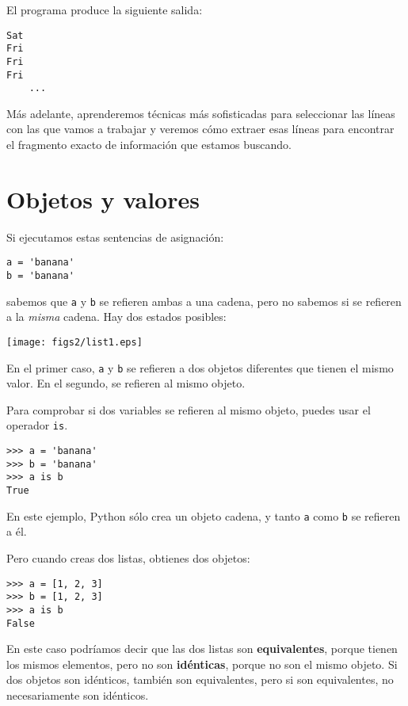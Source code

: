 El programa produce la siguiente salida:

\beforeverb
\begin{verbatim}
Sat
Fri
Fri
Fri
    ...
\end{verbatim}
\afterverb
%
Más adelante, aprenderemos técnicas más sofisticadas para
seleccionar las líneas con las que vamos a trabajar y veremos cómo extraer
esas líneas para encontrar el fragmento exacto de información
que estamos buscando.

\section{Objetos y valores}


Si ejecutamos estas sentencias de asignación:

\beforeverb
\begin{verbatim}
a = 'banana'
b = 'banana'
\end{verbatim}
\afterverb
%
sabemos que {\tt a} y {\tt b} se refieren ambas a una
cadena, pero no sabemos si se refieren a la
\emph{misma} cadena. Hay dos estados posibles:


\beforefig
\centerline{\texttt{[image: figs2/list1.eps]}}
\afterfig

En el primer caso, {\tt a} y {\tt b} se refieren a dos objetos diferentes que
tienen el mismo valor. En el segundo, se refieren al mismo
objeto.


Para comprobar si dos variables se refieren al mismo objeto, puedes
usar el operador {\tt is}.

\beforeverb
\begin{verbatim}
>>> a = 'banana'
>>> b = 'banana'
>>> a is b
True
\end{verbatim}
\afterverb
%
En este ejemplo, Python sólo crea un objeto cadena,
y tanto {\tt a} como {\tt b} se refieren a él.

Pero cuando creas dos listas, obtienes dos objetos:

\beforeverb
\begin{verbatim}
>>> a = [1, 2, 3]
>>> b = [1, 2, 3]
>>> a is b
False
\end{verbatim}
\afterverb
%

En este caso podríamos decir que las dos listas son {\bf equivalentes},
porque tienen los mismos elementos, pero no son {\bf idénticas}, porque
no son el mismo objeto. Si dos objetos son idénticos, también
son equivalentes, pero si son equivalentes, no necesariamente
son idénticos.

